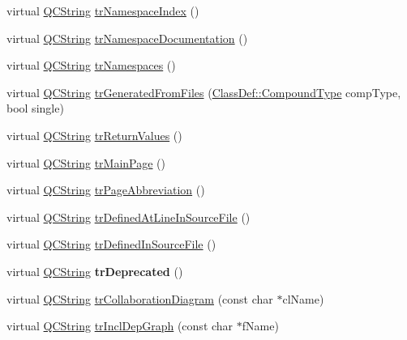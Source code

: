 \begin{DoxyCompactItemize}
\item 
virtual \mbox{\hyperlink{class_q_c_string}{Q\+C\+String}} \mbox{\hyperlink{class_translator_serbian_a4e9dbaf6be2b393469a2412b1847a89c}{tr\+Namespace\+Index}} ()
\item 
virtual \mbox{\hyperlink{class_q_c_string}{Q\+C\+String}} \mbox{\hyperlink{class_translator_serbian_a02e4a66d267c2e9e5d3af7e983a0a8a5}{tr\+Namespace\+Documentation}} ()
\item 
virtual \mbox{\hyperlink{class_q_c_string}{Q\+C\+String}} \mbox{\hyperlink{class_translator_serbian_aafd98ed940f0263346635bb228ea4de0}{tr\+Namespaces}} ()
\item 
virtual \mbox{\hyperlink{class_q_c_string}{Q\+C\+String}} \mbox{\hyperlink{class_translator_serbian_aa8b4c7f009f386e5e09e1879cf400e9f}{tr\+Generated\+From\+Files}} (\mbox{\hyperlink{class_class_def_ae70cf86d35fe954a94c566fbcfc87939}{Class\+Def\+::\+Compound\+Type}} comp\+Type, bool single)
\item 
virtual \mbox{\hyperlink{class_q_c_string}{Q\+C\+String}} \mbox{\hyperlink{class_translator_serbian_aff541c37d8ddcf6b30eb21ea2e4c7ff5}{tr\+Return\+Values}} ()
\item 
virtual \mbox{\hyperlink{class_q_c_string}{Q\+C\+String}} \mbox{\hyperlink{class_translator_serbian_ab853a7762887e5ff90896e45c31f38c2}{tr\+Main\+Page}} ()
\item 
virtual \mbox{\hyperlink{class_q_c_string}{Q\+C\+String}} \mbox{\hyperlink{class_translator_serbian_a75bdd1c8caecedde8d17b1874f776393}{tr\+Page\+Abbreviation}} ()
\item 
virtual \mbox{\hyperlink{class_q_c_string}{Q\+C\+String}} \mbox{\hyperlink{class_translator_serbian_a7204c64240f119b344f318f850828b67}{tr\+Defined\+At\+Line\+In\+Source\+File}} ()
\item 
virtual \mbox{\hyperlink{class_q_c_string}{Q\+C\+String}} \mbox{\hyperlink{class_translator_serbian_a5a1c1cab525d4d6e201feec2afd25a75}{tr\+Defined\+In\+Source\+File}} ()
\item 
\mbox{\label{class_translator_serbian_af533b4cee889eb446b821ed2ab385a7c}} 
virtual \mbox{\hyperlink{class_q_c_string}{Q\+C\+String}} {\bfseries tr\+Deprecated} ()
\item 
virtual \mbox{\hyperlink{class_q_c_string}{Q\+C\+String}} \mbox{\hyperlink{class_translator_serbian_acd6bab03be6bacd4812bfd9d86666285}{tr\+Collaboration\+Diagram}} (const char $\ast$cl\+Name)
\item 
virtual \mbox{\hyperlink{class_q_c_string}{Q\+C\+String}} \mbox{\hyperlink{class_translator_serbian_a65accb1969f0430fcbc5f1e48a36524a}{tr\+Incl\+Dep\+Graph}} (const char $\ast$f\+Name)

\end{DoxyCompactItemize}
